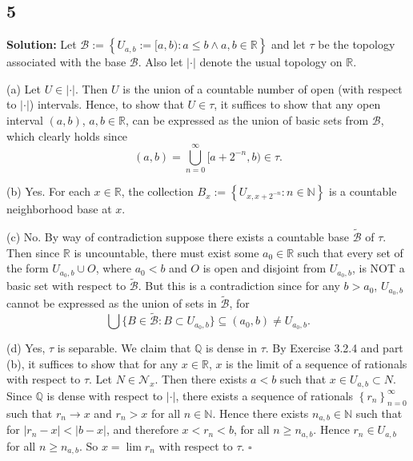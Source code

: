 \documentclass[12pt]{article}
\newcounter{ProofCounter}
\newenvironment{Solution}{\stepcounter{ProofCounter}\textbf{Solution:}}{\hfill$\square$}
\begin{document}
\subsection*{5}
\begin{Solution}
  Let $\mathcal{B} := \left\{ U_{a,b} := [a,b) : a \leq b \wedge a,b\in \mathbb{R} \right\}$ and let $\tau$ be the topology associated with the base $\mathcal{B}$.
  Also let $|\cdot|$ denote the usual topology on $\mathbb{R}$.

  (a) Let $U \in |\cdot|$. Then $U$ is the union of a countable number of open (with respect to $|\cdot|$) intervals. Hence, to show that $U \in \tau$, it suffices to show that
  any open interval $(a,b)$, $a,b \in \mathbb{R}$, can be expressed as the union of basic sets from $\mathcal{B}$, which clearly holds since 
  \[
    (a,b) = \bigcup_{n=0}^{\infty}[a + 2^{-n}, b) \in \tau.
  \]

  (b) Yes. For each $x \in \mathbb{R}$, the collection $B_x := \left\{ U_{x,x+2^{-n}} : n \in \mathbb{N} \right\}$ is a countable neighborhood base at
  $x$.

  (c) No. By way of contradiction suppose there exists a countable base $\tilde{\mathcal{B}}$ of $\tau$. Then since $\mathbb{R}$ is uncountable, there must
  exist some $a_0 \in \mathbb{R}$ such that every set of the form $U_{a_0,b} \cup O$, where $a_0 < b$ and $O$ is open and disjoint from $U_{a_0,b}$, is NOT a basic set with respect to
  $\tilde{\mathcal{B}}$. But this is a contradiction since for any $b > a_0$, $U_{a_0,b}$ cannot be expressed as the union of sets in $\tilde{\mathcal{B}}$, for 
  \[
    \bigcup \{B \in \tilde{\mathcal{B}} : B\subset U_{a_0,b}\} \subseteq (a_0, b) \neq U_{a_0,b}.
  \]

  (d) Yes, $\tau$ is separable. We claim that $\mathbb{Q}$ is dense in $\tau$. By Exercise 3.2.4 and part (b), it suffices to show that for any $x \in
  \mathbb{R}$, $x$ is the limit of a sequence of rationals with respect to $\tau$. Let $N \in \mathcal{N}_x$. Then there exists $a < b$ such that $x \in U_{a,b} \subset N$.
  Since $\mathbb{Q}$ is dense with respect to $|\cdot|$, there exists a sequence of rationals $\left\{ r_n \right\}_{n=0}^{\infty}$ such that $r_n
  \rightarrow x$ and $r_n > x$ for all $n \in \mathbb{N}$. Hence there exists $n_{a,b} \in\mathbb{N}$ such that for $|r_n - x| < |b - x|$,
  and therefore $x < r_n < b$, for all $n
  \geq n_{a,b}$. Hence $r_n \in U_{a,b}$ for all $n \geq n_{a,b}$. So $x = \lim r_n$ with respect to $\tau$.
\end{Solution}
\end{document}
